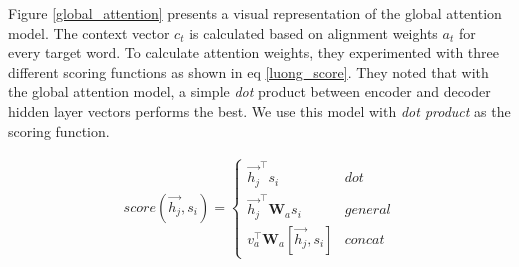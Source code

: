 Figure \ref{global_attention} presents a visual representation of the global attention model. The context vector $c_t$ is calculated based on alignment weights $a_t$ for every target word. To calculate attention weights, they experimented with three different scoring functions as shown in eq \ref{luong_score}. They noted that with the global attention model, a simple \textit{dot} product between encoder and decoder hidden layer vectors performs the best. We use this model with \textit{dot product} as the scoring function.

\begin{align}
\label{luong_score}
score(\overrightarrow{h_j}, s_i) =
\begin{cases}
\overrightarrow{h_j} ^\top s_i & dot \\
\overrightarrow{h_j} ^\top \textbf{W}_a s_i & general \\
v_a ^\top \textbf{W}_a [ \overrightarrow{h_j}, s_i ] & concat
\end{cases}
\end{align}


%
%
%

